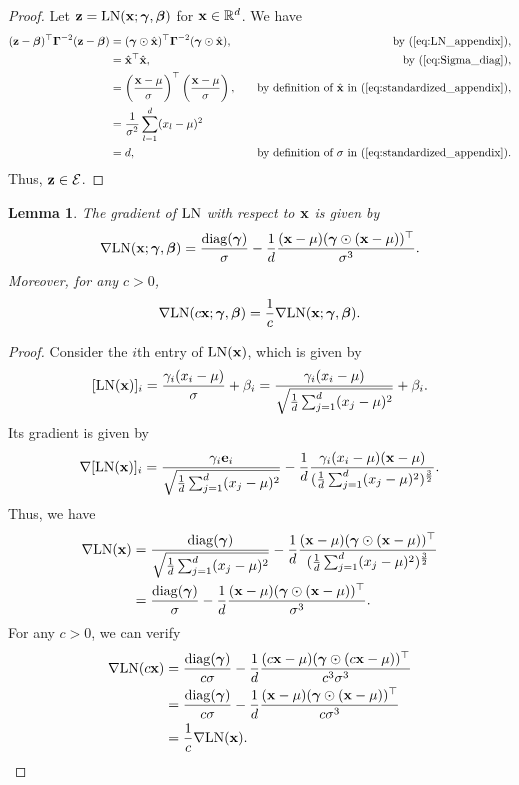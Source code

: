 \documentclass[journal]{IEEEtran}
\newcommand{\bfe}{{\bf e}}
\newcommand{\bfx}{{\bf x}}
\newcommand{\bfz}{{\bf z}}
\newcommand{\bfgamma}{{\boldsymbol \gamma}}
\newcommand{\bfGamma}{{\boldsymbol \Gamma}}
\newcommand{\bfbeta}{{\boldsymbol \beta}}
\theoremstyle{plain}
\newtheorem{lemma}[theorem]{Lemma}
\theoremstyle{definition}
\theoremstyle{remark}
\begin{document}
\begin{proof}
        Let $\bfz=\text{LN}(\bfx; \bfgamma, \bfbeta)$ for $\bfx \in \mathbb{R}^d$. We have
\begin{align*}
    (\bfz - \bfbeta)^\top \bfGamma^{-2} (\bfz - \bfbeta) &= (\bfgamma \odot \hat{\bfx})^\top \bfGamma^{-2} (\bfgamma \odot \hat{\bfx}), \quad &\text{by~(\ref{eq:LN_appendix})}, \\
    &= \hat{\bfx}^\top \hat{\bfx}, \quad &\text{by~(\ref{eq:Sigma_diag})}, \\
    &= \left( \frac{\bfx - \mu}{\sigma}\right)^\top \left( \frac{\bfx - \mu}{\sigma}\right), \quad &\text{by definition of $\hat{\bfx}$ in (\ref{eq:standardized_appendix})}, \\
    &= \frac{1}{\sigma^2} \sum_{l=1}^d (x_l - \mu)^2 \\
    &= d, \quad &\text{by definition of $\sigma$ in (\ref{eq:standardized_appendix})}.
\end{align*}
Thus, $\bfz \in \mathcal{E}$.
\end{proof}

\begin{lemma}\label{prop:grad_LN}
    The gradient of $\rm LN$ with respect to $\bfx$ is given by 
    $$
    \nabla {\rm LN}(\bfx; \bfgamma, \bfbeta) = \frac{{\rm diag}(\bfgamma)}{\sigma} - \frac{1}{d} \frac{(\bfx-\mu)(\bfgamma \odot (\bfx-\mu))^\top}{\sigma^3}. 
    $$
    Moreover, for any $c > 0$, 
    $$
    \nabla {\rm LN}(c\bfx; \bfgamma, \bfbeta) = \frac{1}{c}\nabla {\rm LN}(\bfx; \bfgamma, \bfbeta).
    $$
\end{lemma}

\begin{proof}
    Consider the $i$th entry of ${\rm LN}(\bfx)$, which is given by
    $$
    [{\rm LN}(\bfx)]_i = \frac{\gamma_i (x_i-\mu)}{\sigma} + \beta_i = \frac{\gamma_i (x_i-\mu)}{\sqrt{\frac{1}{d} \sum_{j=1}^d (x_j - \mu)^2}} + \beta_i.
    $$
    Its gradient is given by
    $$
    \nabla [{\rm LN}(\bfx)]_i = \frac{\gamma_i \bfe_i }{\sqrt{\frac{1}{d} \sum_{j=1}^d (x_j - \mu)^2}} - \frac{1}{d} \frac{\gamma_i(x_i-\mu)(\bfx-\mu)}{(\frac{1}{d} \sum_{j=1}^d (x_j - \mu)^2)^{\frac{3}{2}}}.
    $$
    Thus, we have 
    \begin{align*}
    \nabla {\rm LN}(\bfx) &= \frac{{\rm diag}(\bfgamma)}{\sqrt{\frac{1}{d} \sum_{j=1}^d (x_j - \mu)^2}} - \frac{1}{d} \frac{(\bfx-\mu)(\bfgamma \odot (\bfx-\mu))^\top}{(\frac{1}{d} \sum_{j=1}^d (x_j - \mu)^2)^{\frac{3}{2}}} \\
    &= \frac{{\rm diag}(\bfgamma)}{\sigma} - \frac{1}{d} \frac{(\bfx-\mu)(\bfgamma \odot (\bfx-\mu))^\top}{\sigma^3}.
    \end{align*}
    For any $c > 0$, we can verify
    \begin{align*}
    \nabla {\rm LN}(c\bfx) &= \frac{{\rm diag}(\bfgamma)}{c \sigma} - \frac{1}{d} \frac{(c\bfx-\mu)(\bfgamma \odot (c\bfx-\mu))^\top}{c^3 \sigma^3} \\
    &= \frac{{\rm diag}(\bfgamma)}{c \sigma} - \frac{1}{d} \frac{(\bfx-\mu)(\bfgamma \odot (\bfx-\mu))^\top}{c \sigma^3} \\
    &= \frac{1}{c} \nabla {\rm LN}(\bfx).
    \end{align*}
\end{proof}
\end{document}
